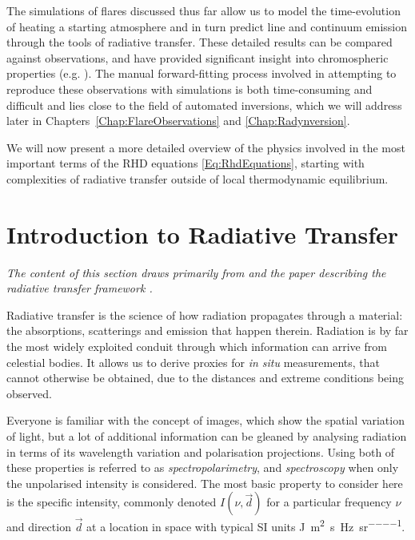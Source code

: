 The simulations of flares discussed thus far allow us to model the time-evolution of heating a starting atmosphere and in turn predict line and continuum emission through the tools of radiative transfer.
These detailed results can be compared against observations, and have provided significant insight into chromospheric properties (e.g. \citet{Kuridze2015,RubioDaCosta2016,Kowalski2017,Simoes2017}).
The manual forward-fitting process involved in attempting to reproduce these observations with simulations is both time-consuming and difficult and lies close to the field of automated inversions, which we will address later in Chapters~\ref{Chap:FlareObservations} and \ref{Chap:Radynversion}.

We will now present a more detailed overview of the physics involved in the most important terms of the RHD equations \eqref{Eq:RhdEquations}, starting with complexities of radiative transfer outside of local thermodynamic equilibrium.

\section{Introduction to Radiative Transfer}\label{Sec:IntroRT}

\emph{The content of this section draws primarily from \citet{Hubeny2014} and the paper describing the \Lw{} radiative transfer framework \citep{Osborne2021}.}

Radiative transfer is the science of how radiation propagates through a material: the absorptions, scatterings and emission that happen therein.
Radiation is by far the most widely exploited conduit through which information can arrive from celestial bodies.
It allows us to derive proxies for \emph{in situ} measurements, that cannot otherwise be obtained, due to the distances and extreme conditions being observed.

Everyone is familiar with the concept of images, which show the spatial variation of light, but a lot of additional information can be gleaned by analysing radiation in terms of its wavelength variation and polarisation projections.
Using both of these properties is referred to as \emph{spectropolarimetry}, and \emph{spectroscopy} when only the unpolarised intensity is considered.
The most basic property to consider here is the specific intensity, commonly denoted $I(\nu, \vec{d})$ for a particular frequency $\nu$ and direction $\vec{d}$ at a location in space with typical SI units \si{\joule\per\square\metre\per\s\per\hertz\per\steradian}.

